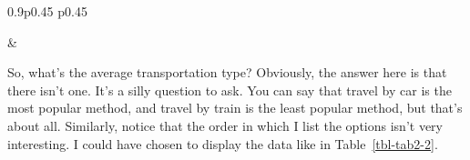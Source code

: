 \documentclass[
  a4paper,
]{book}
\begin{document}
\begin{table}[ht]
\begin{centerbox}
\begin{threeparttable}
\begin{tabularx}{0.9\textwidth}{p{} p{}}
\hhline{}

 &
 \tabularnewline[-0.5pt]


\end{tabularx} 

\end{threeparttable}\par\end{centerbox}

\end{table}
 

So, what's the average transportation type? Obviously, the answer here
is that there isn't one. It's a silly question to ask. You can say that
travel by car is the most popular method, and travel by train is the
least popular method, but that's about all. Similarly, notice that the
order in which I list the options isn't very interesting. I could have
chosen to display the data like in Table~\ref{tbl-tab2-2}.

\hypertarget{tbl-tab2-2}{}
 
  \providecommand{\huxb}[2]{\arrayrulecolor[RGB]{#1}\global\arrayrulewidth=#2pt}
  \providecommand{\huxvb}[2]{\color[RGB]{#1}\vrule width #2pt}
  \providecommand{\huxtpad}[1]{\rule{0pt}{#1}}
  \providecommand{\huxbpad}[1]{\rule[-#1]{0pt}{#1}}
\end{document}
